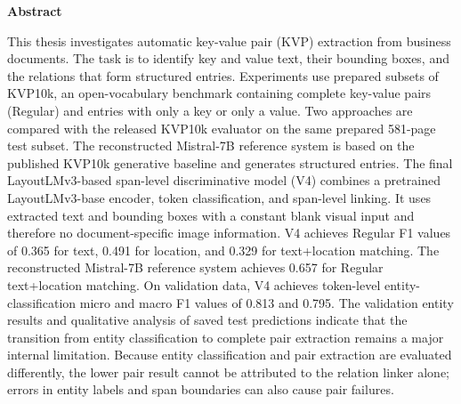 \cleardoublepage
\thispagestyle{empty}

\begin{center}
  \bfseries
  {Abstract}
\end{center}
\normalfont

\vspace{0.5cm}

This thesis investigates automatic key-value pair (KVP) extraction from
business documents. The task is to identify key and value text, their bounding
boxes, and the relations that form structured entries. Experiments use prepared subsets of KVP10k,
an open-vocabulary benchmark containing complete key-value pairs (Regular) and
entries with only a key or only a value. Two approaches are compared with the
released KVP10k evaluator on the same prepared 581-page test subset. The
reconstructed Mistral-7B reference system is based on the published KVP10k
generative baseline and generates structured entries. The final
LayoutLMv3-based span-level discriminative model (V4) combines a pretrained
LayoutLMv3-base encoder, token classification, and span-level linking. It uses
extracted text and bounding boxes with a constant blank visual input and
therefore no document-specific image information. V4 achieves Regular F1 values
of 0.365 for text, 0.491 for location, and 0.329 for text+location matching. The
reconstructed Mistral-7B reference system achieves 0.657 for Regular
text+location matching. On validation data, V4 achieves token-level
entity-classification micro and macro F1 values of 0.813 and 0.795. The
validation entity results and qualitative analysis of saved test predictions
indicate that the transition from entity classification to complete pair
extraction remains a major internal limitation. Because entity classification
and pair extraction are evaluated differently, the lower pair result cannot be
attributed to the relation linker alone; errors in entity labels and span
boundaries can also cause pair failures.
\clearpage
